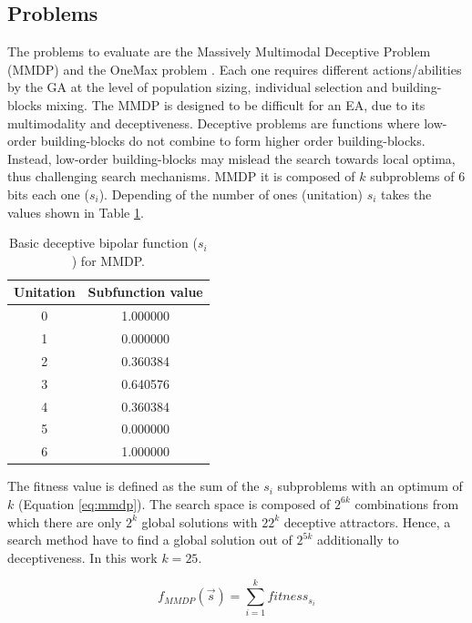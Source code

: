 \documentclass[final,1p,times]{elsarticle}
\begin{document}
\subsection{Problems}
The problems to evaluate are the Massively Multimodal Deceptive Problem (MMDP) \cite{goldberg92massive} and the OneMax problem \cite{ONEMAX}. Each one requires different actions/abilities by the GA at the level of population sizing, individual selection and building-blocks mixing. The MMDP
 is designed to be difficult for an EA, due to
its multimodality and deceptiveness. Deceptive problems are functions where low-order building-blocks do not combine to form higher order building-blocks. Instead, low-order building-blocks may mislead the search towards local optima, thus challenging search mechanisms. MMDP it is composed of $k$ subproblems of 6 bits each one ($s_i$). Depending of
the number of ones (unitation) $s_i$ takes the values shown in Table \ref{table:mmdpvalues}.  

\begin{table}

\centering
{\scriptsize
\caption{ Basic deceptive bipolar function ($s_i$) for MMDP.}
\label{table:mmdpvalues}
\begin{tabular}{|c|c|}
\hline
Unitation&Subfunction value\\
\hline
0 & 1.000000 \\
\hline
1 & 0.000000 \\
\hline
2 & 0.360384 \\
\hline
3 & 0.640576\\
\hline
4 & 0.360384\\
\hline
5 & 0.000000\\
\hline
6 & 1.000000\\
\hline

\end{tabular}
}


\end{table}



The fitness value is defined as the sum of the $s_i$ subproblems with an optimum of $k$ (Equation \ref{eq:mmdp}).
The search space is composed of $2^{6k}$ combinations from which there
are only $2^k$ global solutions with $22^k$ deceptive
attractors. Hence, a search method have to find a global solution
out of $2^{5k}$ additionally to deceptiveness. In this work $k=25$. 

\begin{equation}\label{eq:mmdp}
f_{MMDP}(\vec s)= \sum_{i=1}^{k} fitness_{s_i}
\end{equation}
\end{document}

